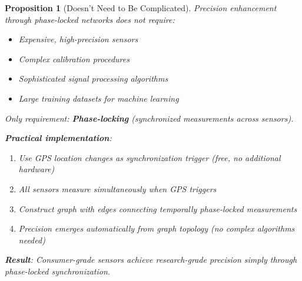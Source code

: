 \documentclass[11pt,a4paper]{article}
\newtheorem{proposition}[theorem]{Proposition}
\theoremstyle{definition}
\theoremstyle{remark}
\begin{document}
\begin{proposition}[Doesn't Need to Be Complicated]
Precision enhancement through phase-locked networks \textit{does not require}:
\begin{itemize}
\item Expensive, high-precision sensors
\item Complex calibration procedures
\item Sophisticated signal processing algorithms
\item Large training datasets for machine learning
\end{itemize}

Only requirement: \textbf{Phase-locking} (synchronized measurements across sensors).

\textbf{Practical implementation}:
\begin{enumerate}
\item Use GPS location changes as synchronization trigger (free, no additional hardware)
\item All sensors measure simultaneously when GPS triggers
\item Construct graph with edges connecting temporally phase-locked measurements
\item Precision emerges automatically from graph topology (no complex algorithms needed)
\end{enumerate}

\textbf{Result}: Consumer-grade sensors achieve research-grade precision simply through phase-locked synchronization.
\end{proposition}
\end{document}
